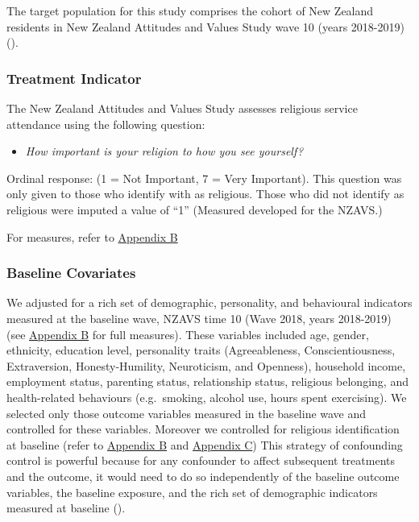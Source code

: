 \documentclass[
  single column]{article}
\providecommand{\tightlist}{%
  \setlength{\itemsep}{0pt}\setlength{\parskip}{0pt}}
\begin{document}
The target population for this study comprises the cohort of New Zealand
residents in New Zealand Attitudes and Values Study wave 10 (years
2018-2019) ().

\subsubsection{Treatment Indicator}\label{treatment-indicator}

The New Zealand Attitudes and Values Study assesses religious service
attendance using the following question:

\begin{itemize}
\tightlist
\item
  \emph{How important is your religion to how you see yourself?}
\end{itemize}

Ordinal response: (1 = Not Important, 7 = Very Important). This question
was only given to those who identify with as religious. Those who did
not identify as religious were imputed a value of ``1'' (Measured
developed for the NZAVS.)

For measures, refer to \hyperref[appendix-baseline]{Appendix B}

\subsubsection{Baseline Covariates}\label{baseline-covariates}

We adjusted for a rich set of demographic, personality, and behavioural
indicators measured at the baseline wave, NZAVS time 10 (Wave 2018,
years 2018-2019) (see \hyperref[appendix-baseline]{Appendix B} for full
measures). These variables included age, gender, ethnicity, education
level, personality traits (Agreeableness, Conscientiousness,
Extraversion, Honesty-Humility, Neuroticism, and Openness), household
income, employment status, parenting status, relationship status,
religious belonging, and health-related behaviours (e.g.~smoking,
alcohol use, hours spent exercising). We selected only those outcome
variables measured in the baseline wave and controlled for these
variables. Moreover we controlled for religious identification at
baseline (refer to \hyperref[appendix-baseline]{Appendix B} and
\hyperref[appendix-confounding]{Appendix C}) This strategy of
confounding control is powerful because for any confounder to affect
subsequent treatments and the outcome, it would need to do so
independently of the baseline outcome variables, the baseline exposure,
and the rich set of demographic indicators measured at baseline
().
\end{document}
